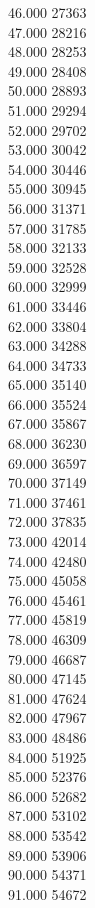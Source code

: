{ 46.000	27363 \\
 47.000	28216 \\
 48.000	28253 \\
 49.000	28408 \\
 50.000	28893 \\
 51.000	29294 \\
 52.000	29702 \\
 53.000	30042 \\
 54.000	30446 \\
 55.000	30945 \\
 56.000	31371 \\
 57.000	31785 \\
 58.000	32133 \\
 59.000	32528 \\
 60.000	32999 \\
 61.000	33446 \\
 62.000	33804 \\
 63.000	34288 \\
 64.000	34733 \\
 65.000	35140 \\
 66.000	35524 \\
 67.000	35867 \\
 68.000	36230 \\
 69.000	36597 \\
 70.000	37149 \\
 71.000	37461 \\
 72.000	37835 \\
 73.000	42014 \\
 74.000	42480 \\
 75.000	45058 \\
 76.000	45461 \\
 77.000	45819 \\
 78.000	46309 \\
 79.000	46687 \\
 80.000	47145 \\
 81.000	47624 \\
 82.000	47967 \\
 83.000	48486 \\
 84.000	51925 \\
 85.000	52376 \\
 86.000	52682 \\
 87.000	53102 \\
 88.000	53542 \\
 89.000	53906 \\
 90.000	54371 \\
 91.000	54672 \\
}

